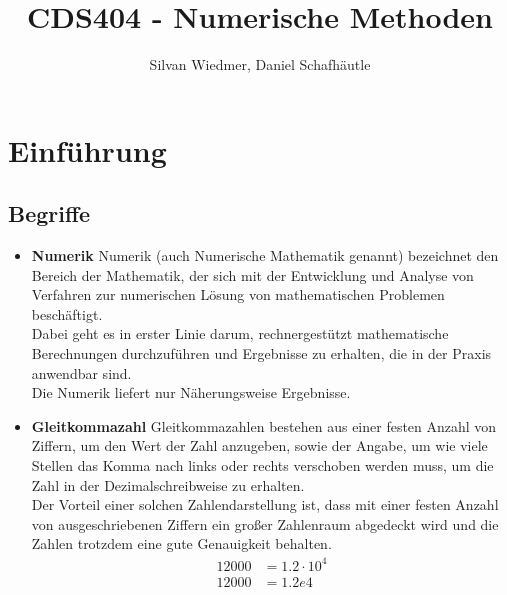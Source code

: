 \documentclass [final]{article}
\theoremstyle{definition}
\begin{document}
\title{CDS404 - Numerische Methoden}
\author{Silvan Wiedmer, Daniel Schafhäutle}
\maketitle

\tableofcontents


\section{Einführung}
\subsection{Begriffe}
\begin{itemize}
	\item {\bfseries Numerik} \linebreak
	Numerik (auch Numerische Mathematik genannt) bezeichnet den Bereich der Mathematik, der sich mit der Entwicklung und Analyse von Verfahren zur numerischen Lösung von mathematischen Problemen beschäftigt. \\
	Dabei geht es in erster Linie darum, rechnergestützt mathematische Berechnungen durchzuführen und Ergebnisse zu erhalten, die in der Praxis anwendbar sind. \\
	Die Numerik liefert nur Näherungsweise Ergebnisse.
	\item {\bfseries Gleitkommazahl} \linebreak
	Gleitkommazahlen bestehen aus einer festen Anzahl von Ziffern, um den Wert der Zahl anzugeben, sowie der Angabe, um wie viele Stellen das Komma nach links oder rechts verschoben werden muss, um die Zahl in der Dezimalschreibweise zu erhalten. \\
	Der Vorteil einer solchen Zahlendarstellung ist, dass mit einer festen Anzahl von ausgeschriebenen Ziffern ein großer Zahlenraum abgedeckt wird und die Zahlen trotzdem eine gute Genauigkeit behalten.\\

	\begin{align*}
	12000  &=  1.2\cdot10^4 \\
	12000 &=  1.2e4
	\end{align*}


\end{itemize}
\end{document}
